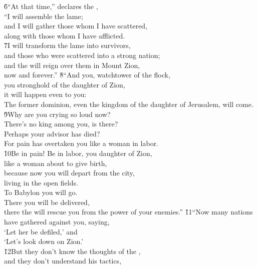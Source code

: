 \begin{poetry}
\poeml \v{6}``At that time,'' declares the , \\
\poemll    ``I will assemble the lame; \\
\poeml and I will gather those whom I have scattered, \\
\poemll    along with those whom I have afflicted. \\
\poeml \v{7}I will transform the lame into survivors, \\
\poemll    and those who were scattered into a strong nation; \\
\poeml and the  will reign over them in Mount Zion, \\
\poemll    now and forever.''
\poeml \v{8}``And you, watchtower of the flock, \\
\poemll    you stronghold of the daughter of Zion, \\
\poeml it will happen even to you: \\
\poemlll       The former dominion, even the kingdom of the daughter of Jerusalem, will come. \\
\poeml \v{9}Why are you crying so loud now? \\
\poemll    There's no king among you, is there? \\
\poeml Perhaps your advisor has died? \\
\poemll    For pain has overtaken you like a woman in labor. \\
\poeml \v{10}Be in pain! Be in labor, you daughter of Zion, \\
\poemll    like a woman about to give birth, \\
\poeml because now you will depart from the city, \\
\poemll    living in the open fields. \\
\poeml To Babylon you will go. \\
\poemll    There you will be delivered, \\
\poemlll       there the  will rescue you from the power of your enemies.''
\poeml \v{11}``Now many nations have gathered against you, saying, \\
\poemll    `Let her be defiled,' and \\
\poemlll       `Let's look down on Zion.' \\
\poeml \v{12}But they don't know the thoughts of the , \\
\poemll    and they don't understand his tactics, \\

\end{poetry}
